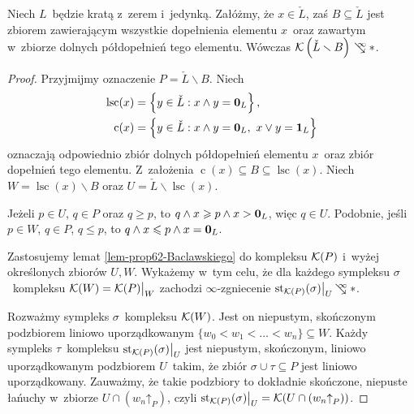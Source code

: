 \begin{tw}\label{tw-baclawskiego-kraty-bez-dopelnien-sa-zgniatalne}
Niech $L$~będzie kratą z~zerem i~jedynką. Załóżmy, że $x\in \check{L}$, zaś $B\subseteq \check{L}$ jest zbiorem zawierającym wszystkie dopełnienia elementu $x$~oraz zawartym w~zbiorze dolnych półdopełnień tego elementu. Wówczas $\mK\left(\check{L}\smallsetminus B\right)\infcoll *$. 
\end{tw}
\begin{proof}
Przyjmijmy oznaczenie $P=\check{L}\smallsetminus B$. Niech \begin{align*}\operatorname{lsc}(x)&=\left\{y\in\check{L}:x\land y=\lbottom_L\right\},\\ \operatorname{c}(x)&=\left\{y\in\check{L}:x\land y=\lbottom_L,\ x\lor y=\ltop_L\right\}\end{align*} oznaczają odpowiednio zbiór dolnych półdopełnień elementu $x$~oraz zbiór dopełnień tego elementu. Z~założenia $\operatorname{c}(x)\subseteq B\subseteq \operatorname{lsc}(x)$. Niech $W=\operatorname{lsc}(x)\smallsetminus B$ oraz $U=\check{L}\smallsetminus \operatorname{lsc}(x)$.

Jeżeli $p\in U$, $q\in P$ oraz $q\geq p$, to $q\land x\geqslant p\land x> \mathbf{0}_L$, więc $q\in U$. Podobnie, jeśli $p\in W$, $q\in P$, $q\leq p$, to $q\land x\leqslant p\land x=\mathbf{0}_L$.

Zastosujemy lemat \ref{lem-prop62-Baclawskiego} do kompleksu $\mathcal{K}(P)$ i~wyżej określonych zbiorów $U,W$. Wykażemy w~tym celu, że dla każdego sympleksu $\sigma$~kompleksu $\mathcal{K}(W)=\mathcal{K}(P)\big|_W$ zachodzi \mbox{$\infty$-zgniecenie} $\st_{\mK(P)}(\sigma)\big|_U\infcoll *$.

Rozważmy sympleks $\sigma$~kompleksu $\mathcal{K}(W)$. Jest on niepustym, skończonym podzbiorem liniowo uporządkowanym $\{w_0<w_1<\ldots<w_n\}\subseteq W$. Każdy sympleks $\tau$~kompleksu $\operatorname{st}_{\mathcal{K}(P)}(\sigma)\big|_U$ jest niepustym, skończonym, liniowo uporządkowanym podzbiorem $U$~takim, że zbiór $\sigma\cup \tau\subseteq P$ jest liniowo uporządkowany. Zauważmy, że takie podzbiory to dokładnie skończone, niepuste łańuchy w~zbiorze $U\cap \left(w_n\mathord{\uparrow}_P\right)$, czyli $\operatorname{st}_{\mathcal{K}(P)}(\sigma)\big|_U=\mathcal{K}(U\cap (w_n\mathord{\uparrow}_P))$. 


\end{proof}
